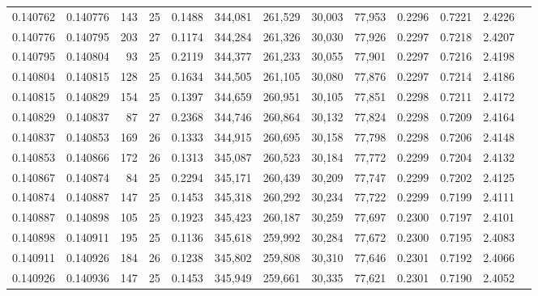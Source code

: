 \begin{tabular}{rrrrrrrrrrrrr}
0.140762 & 0.140776 &   143 &  25 &                                     0.1488 & 344,081 & 261,529 &  30,003 &  77,953 & 0.2296 & 0.7221 & 2.4226 \\
0.140776 & 0.140795 &   203 &  27 &                                     0.1174 & 344,284 & 261,326 &  30,030 &  77,926 & 0.2297 & 0.7218 & 2.4207 \\
0.140795 & 0.140804 &    93 &  25 &                                     0.2119 & 344,377 & 261,233 &  30,055 &  77,901 & 0.2297 & 0.7216 & 2.4198 \\
0.140804 & 0.140815 &   128 &  25 &                                     0.1634 & 344,505 & 261,105 &  30,080 &  77,876 & 0.2297 & 0.7214 & 2.4186 \\
0.140815 & 0.140829 &   154 &  25 &                                     0.1397 & 344,659 & 260,951 &  30,105 &  77,851 & 0.2298 & 0.7211 & 2.4172 \\
0.140829 & 0.140837 &    87 &  27 &                                     0.2368 & 344,746 & 260,864 &  30,132 &  77,824 & 0.2298 & 0.7209 & 2.4164 \\
0.140837 & 0.140853 &   169 &  26 &                                     0.1333 & 344,915 & 260,695 &  30,158 &  77,798 & 0.2298 & 0.7206 & 2.4148 \\
0.140853 & 0.140866 &   172 &  26 &                                     0.1313 & 345,087 & 260,523 &  30,184 &  77,772 & 0.2299 & 0.7204 & 2.4132 \\
0.140867 & 0.140874 &    84 &  25 &                                     0.2294 & 345,171 & 260,439 &  30,209 &  77,747 & 0.2299 & 0.7202 & 2.4125 \\
0.140874 & 0.140887 &   147 &  25 &                                     0.1453 & 345,318 & 260,292 &  30,234 &  77,722 & 0.2299 & 0.7199 & 2.4111 \\
0.140887 & 0.140898 &   105 &  25 &                                     0.1923 & 345,423 & 260,187 &  30,259 &  77,697 & 0.2300 & 0.7197 & 2.4101 \\
0.140898 & 0.140911 &   195 &  25 &                                     0.1136 & 345,618 & 259,992 &  30,284 &  77,672 & 0.2300 & 0.7195 & 2.4083 \\
0.140911 & 0.140926 &   184 &  26 &                                     0.1238 & 345,802 & 259,808 &  30,310 &  77,646 & 0.2301 & 0.7192 & 2.4066 \\
0.140926 & 0.140936 &   147 &  25 &                                     0.1453 & 345,949 & 259,661 &  30,335 &  77,621 & 0.2301 & 0.7190 & 2.4052 \\

\end{tabular}
